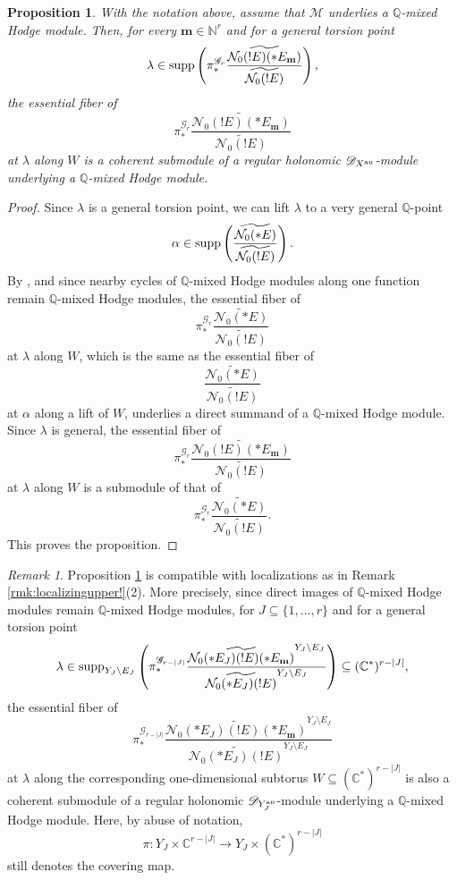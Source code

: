 \documentclass{amsart}
\theoremstyle{plain}
\numberwithin{theorem}{section}
\newtheorem{prop}[theorem]{Proposition}
\theoremstyle{definition}
\theoremstyle{remark}
\newtheorem{remark}[theorem]{Remark}
\theoremstyle{definition}
\newcommand{\wt}{\widetilde}
\newcommand{\C}{\mathbb{C}} %
\newcommand{\N}{\mathbb{N}}
\newcommand{\Q}{\mathbb{Q}}
\newcommand{\cM}{\mathcal{M}}
\newcommand{\cN}{\mathcal{N}}
\newcommand{\bm}{\mathbf{m}}
\newcommand{\sG}{\mathscr{G}}
\newcommand{\shD}{\mathscr{D}}
\newcommand{\an}{\textup{an}}
\newcommand{\supp}{\textup{supp}}
\begin{document}
\begin{prop}\label{prop:essfibMHM}
With the notation above, assume that $\cM$ underlies a $\Q$-mixed Hodge module.
Then, for every $\bm\in \N^r$ and for a general torsion point
\[
\lambda\in
\supp
\left(
\pi^{\sG_r}_*
\frac{\wt{\cN_0(!E)(*E_\bm)}}{\wt{\cN_0(!E)}}
\right),
\]
the essential fiber of
\[
\pi^{\sG_r}_*
\frac{\wt{\cN_0(!E)(*E_\bm)}}{\wt{\cN_0(!E)}}
\]
at $\lambda$ along $W$ is a coherent submodule of a regular holonomic
$\shD_{X^\an}$-module underlying a $\Q$-mixed Hodge module.
\end{prop}

\begin{proof}
Since $\lambda$ is a general torsion point, we can lift $\lambda$ to a very
general $\Q$-point
\[
\alpha\in
\supp
\left(
\frac{\wt{\cN_0(*E)}}{\wt{\cN_0(!E)}}
\right).
\]
By \cite[Cor.2.18]{WuRHA}, and since nearby cycles of $\Q$-mixed Hodge
modules along one function remain $\Q$-mixed Hodge modules, the essential
fiber of
\[
\pi^{\sG_r}_*
\frac{\wt{\cN_0(*E)}}{\wt{\cN_0(!E)}}
\]
at $\lambda$ along $W$, which is the same as the essential fiber of
\[
\frac{\wt{\cN_0(*E)}}{\wt{\cN_0(!E)}}
\]
at $\alpha$ along a lift of $W$, underlies a direct summand of a
$\Q$-mixed Hodge module. Since $\lambda$ is general, the essential fiber of
\[
\pi^{\sG_r}_*
\frac{\wt{\cN_0(!E)(*E_\bm)}}{\wt{\cN_0(!E)}}
\]
at $\lambda$ along $W$ is a submodule of that of
\[
\pi^{\sG_r}_*
\frac{\wt{\cN_0(*E)}}{\wt{\cN_0(!E)}}.
\]
This proves the proposition.
\end{proof}

\begin{remark}\label{rmk:locessfiMHM}
Proposition \ref{prop:essfibMHM} is compatible with localizations as in
Remark \ref{rmk:localizingupper!}(2). More precisely, since direct images of
$\Q$-mixed Hodge modules remain $\Q$-mixed Hodge modules, for
$J\subseteq\{1,\dots,r\}$ and for a general torsion point
\[
\lambda\in
\supp_{Y_J\setminus E_J}
\left(
\pi^{\sG_{r-|J|}}_*
\frac{
\wt{\cN_0(*E_J)(!E)(*E_\bm)}^{Y_J\setminus E_J}
}{
\wt{\cN_0(*E_J)(!E)}^{Y_J\setminus E_J}
}
\right)
\subseteq
(\C^*)^{r-|J|},
\]
the essential fiber of
\[
\pi^{\sG_{r-|J|}}_*
\frac{
\wt{\cN_0(*E_J)(!E)(*E_\bm)}^{Y_J\setminus E_J}
}{
\wt{\cN_0(*E_J)(!E)}^{Y_J\setminus E_J}
}
\]
at $\lambda$ along the corresponding one-dimensional subtorus
$W\subseteq(\C^*)^{r-|J|}$
is also a coherent submodule of a regular holonomic $\shD_{Y_J^\an}$-module
underlying a $\Q$-mixed Hodge module. Here, by abuse of notation,
\[
\pi\colon Y_J\times \C^{r-|J|}
\to
Y_J\times(\C^*)^{r-|J|}
\]
still denotes the covering map.
\end{remark}
\end{document}
